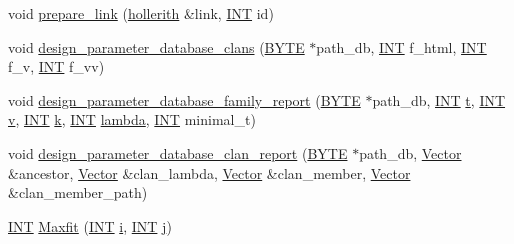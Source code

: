 \begin{DoxyCompactItemize}
\item 
void \mbox{\hyperlink{_l_i_b_2_d_i_s_c_r_e_t_a_2design_8_c_a1442ba1f4ad290900b44b23f0830748e}{prepare\+\_\+link}} (\mbox{\hyperlink{classhollerith}{hollerith}} \&link, \mbox{\hyperlink{galois_8h_a09fddde158a3a20bd2dcadb609de11dc}{I\+NT}} id)
\item 
void \mbox{\hyperlink{_l_i_b_2_d_i_s_c_r_e_t_a_2design_8_c_a730cc0fd8e835bbaa467231eebffd74e}{design\+\_\+parameter\+\_\+database\+\_\+clans}} (\mbox{\hyperlink{galois_8h_ab6cc7b4aeb6ea31aba2b3fbfc83ff5e6}{B\+Y\+TE}} $\ast$path\+\_\+db, \mbox{\hyperlink{galois_8h_a09fddde158a3a20bd2dcadb609de11dc}{I\+NT}} f\+\_\+html, \mbox{\hyperlink{galois_8h_a09fddde158a3a20bd2dcadb609de11dc}{I\+NT}} f\+\_\+v, \mbox{\hyperlink{galois_8h_a09fddde158a3a20bd2dcadb609de11dc}{I\+NT}} f\+\_\+vv)
\item 
void \mbox{\hyperlink{_l_i_b_2_d_i_s_c_r_e_t_a_2design_8_c_a197e657d0a2ec8bb4d40e03438dc3fd7}{design\+\_\+parameter\+\_\+database\+\_\+family\+\_\+report}} (\mbox{\hyperlink{galois_8h_ab6cc7b4aeb6ea31aba2b3fbfc83ff5e6}{B\+Y\+TE}} $\ast$path\+\_\+db, \mbox{\hyperlink{galois_8h_a09fddde158a3a20bd2dcadb609de11dc}{I\+NT}} \mbox{\hyperlink{alphabet2_8_c_ac310d9181e916ba43604099aee272c71}{t}}, \mbox{\hyperlink{galois_8h_a09fddde158a3a20bd2dcadb609de11dc}{I\+NT}} \mbox{\hyperlink{simeon_8_c_aeb3f3030944801b163bc3b829a7f6710}{v}}, \mbox{\hyperlink{galois_8h_a09fddde158a3a20bd2dcadb609de11dc}{I\+NT}} \mbox{\hyperlink{simeon_8_c_a43fa990200c3ddd47c35f151bd4d66bf}{k}}, \mbox{\hyperlink{galois_8h_a09fddde158a3a20bd2dcadb609de11dc}{I\+NT}} \mbox{\hyperlink{plane__search_8_c_ae2170c3116b1f345ee7505695206555e}{lambda}}, \mbox{\hyperlink{galois_8h_a09fddde158a3a20bd2dcadb609de11dc}{I\+NT}} minimal\+\_\+t)
\item 
void \mbox{\hyperlink{_l_i_b_2_d_i_s_c_r_e_t_a_2design_8_c_a744595779bda605193b61d01d79ad981}{design\+\_\+parameter\+\_\+database\+\_\+clan\+\_\+report}} (\mbox{\hyperlink{galois_8h_ab6cc7b4aeb6ea31aba2b3fbfc83ff5e6}{B\+Y\+TE}} $\ast$path\+\_\+db, \mbox{\hyperlink{class_vector}{Vector}} \&ancestor, \mbox{\hyperlink{class_vector}{Vector}} \&clan\+\_\+lambda, \mbox{\hyperlink{class_vector}{Vector}} \&clan\+\_\+member, \mbox{\hyperlink{class_vector}{Vector}} \&clan\+\_\+member\+\_\+path)
\item 
\mbox{\hyperlink{galois_8h_a09fddde158a3a20bd2dcadb609de11dc}{I\+NT}} \mbox{\hyperlink{_l_i_b_2_d_i_s_c_r_e_t_a_2design_8_c_a69b2a48a847dd974a82d3d166cdc0f39}{Maxfit}} (\mbox{\hyperlink{galois_8h_a09fddde158a3a20bd2dcadb609de11dc}{I\+NT}} \mbox{\hyperlink{alphabet2_8_c_acb559820d9ca11295b4500f179ef6392}{i}}, \mbox{\hyperlink{galois_8h_a09fddde158a3a20bd2dcadb609de11dc}{I\+NT}} \mbox{\hyperlink{alphabet2_8_c_a37d972ae0b47b9099e30983131d31916}{j}})
\end{DoxyCompactItemize}


